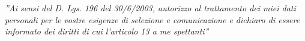 \documentclass[totpages,helvetica,openbib,italian]{europecv}
\begin{document}
\begin{europecv}
\vfill {\small \emph{''Ai sensi del D. Lgs. 196 del 30/6/2003, autorizzo al trattamento dei miei dati personali per le vostre esigenze di selezione e comunicazione e dichiaro di essere informato dei diritti di cui l'articolo 13 a me spettanti''} \par }

\end{europecv}
\end{document}

